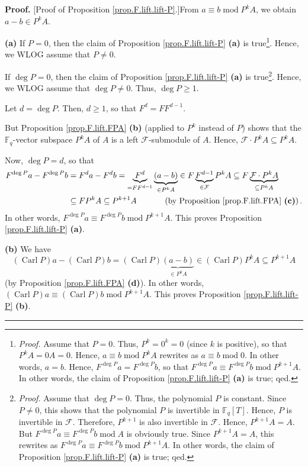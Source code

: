 \documentclass[numbers=enddot,12pt,final,onecolumn,notitlepage]{scrartcl}%
\theoremstyle{definition}
\newenvironment{proof}[1][Proof]{\noindent\textbf{#1.} }{\ \rule{0.5em}{0.5em}}
\begin{document}
\begin{proof}
[Proof of Proposition \ref{prop.F.lift.lift-P}.]From $a\equiv
b\operatorname{mod}P^{k}A$, we obtain $a-b\in P^{k}A$.

\textbf{(a)} If $P=0$, then the claim of Proposition \ref{prop.F.lift.lift-P}
\textbf{(a)} is true\footnote{\textit{Proof.} Assume that $P=0$. Thus,
$P^{k}=0^{k}=0$ (since $k$ is positive), so that $P^{k}A=0A=0$. Hence,
$a\equiv b\operatorname{mod}P^{k}A$ rewrites as $a\equiv b\operatorname{mod}%
0$. In other words, $a=b$. Hence, $F^{\deg P}a=F^{\deg P}b$, so that $F^{\deg
P}a\equiv F^{\deg P}b\operatorname{mod}P^{k+1}A$. In other words, the claim of
Proposition \ref{prop.F.lift.lift-P} \textbf{(a)} is true; qed.}. Hence, we
WLOG assume that $P\neq0$.

If $\deg P=0$, then the claim of Proposition \ref{prop.F.lift.lift-P}
\textbf{(a)} is true\footnote{\textit{Proof.} Assume that $\deg P=0$. Thus,
the polynomial $P$ is constant. Since $P\neq0$, this shows that the polynomial
$P$ is invertible in $\mathbb{F}_{q}\left[  T\right]  $. Hence, $P$ is
invertible in $\mathcal{F}$. Therefore, $P^{k+1}$ is also invertible in
$\mathcal{F}$. Hence, $P^{k+1}A=A$. But $F^{\deg P}a\equiv F^{\deg
P}b\operatorname{mod}A$ is obviously true. Since $P^{k+1}A=A$, this rewrites
as $F^{\deg P}a\equiv F^{\deg P}b\operatorname{mod}P^{k+1}A$. In other words,
the claim of Proposition \ref{prop.F.lift.lift-P} \textbf{(a)} is true; qed.}.
Hence, we WLOG assume that $\deg P\neq0$. Thus, $\deg P\geq1$.

Let $d=\deg P$. Then, $d\geq1$, so that $F^{d}=FF^{d-1}$.

But Proposition \ref{prop.F.lift.FPA} \textbf{(b)} (applied to $P^{k}$ instead
of $P$) shows that the $\mathbb{F}_{q}$-vector subspace $P^{k}A$ of $A$ is a
left $\mathcal{F}$-submodule of $A$. Hence, $\mathcal{F}\cdot P^{k}A\subseteq
P^{k}A$.

Now, $\deg P=d$, so that%
\begin{align*}
F^{\deg P}a-F^{\deg P}b  &  =F^{d}a-F^{d}b=\underbrace{F^{d}}_{=FF^{d-1}%
}\underbrace{\left(  a-b\right)  }_{\in P^{k}A}\in F\underbrace{F^{d-1}}%
_{\in\mathcal{F}}P^{k}A\subseteq F\underbrace{\mathcal{F}\cdot P^{k}%
A}_{\subseteq P^{k}A}\\
&  \subseteq FP^{k}A\subseteq P^{k+1}A\ \ \ \ \ \ \ \ \ \ \left(  \text{by
Proposition \ref{prop.F.lift.FPA} \textbf{(c)}}\right)  .
\end{align*}
In other words, $F^{\deg P}a\equiv F^{\deg P}b\operatorname{mod}P^{k+1}A$.
This proves Proposition \ref{prop.F.lift.lift-P} \textbf{(a)}.

\textbf{(b)} We have%
\[
\left(  \operatorname*{Carl}P\right)  a-\left(  \operatorname*{Carl}P\right)
b=\left(  \operatorname*{Carl}P\right)  \underbrace{\left(  a-b\right)  }_{\in
P^{k}A}\in\left(  \operatorname*{Carl}P\right)  P^{k}A\subseteq P^{k+1}A
\]
(by Proposition \ref{prop.F.lift.FPA} \textbf{(d)}). In other words, $\left(
\operatorname*{Carl}P\right)  a\equiv\left(  \operatorname*{Carl}P\right)
b\operatorname{mod}P^{k+1}A$. This proves Proposition \ref{prop.F.lift.lift-P}
\textbf{(b)}.
\end{proof}
\end{document}
